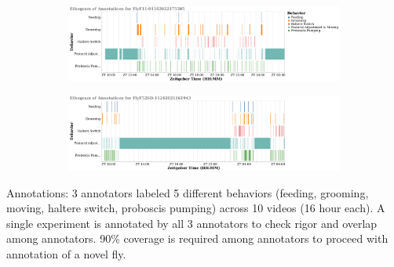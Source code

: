 \begin{figure}[ht!]
	\centering
	\begin{subfigure}[ht!]{0.95\linewidth}
		\centering\includegraphics[width=\linewidth]{figures/FlyF11-01182022175505_annotation_ethogram.pdf}
		\caption{}
	\end{subfigure}%

	\centering
	\begin{subfigure}[ht!]{0.95\linewidth}
		\centering\includegraphics[width=\linewidth]{figures/FlyF52SD-11242021161943_annotation_ethogram.pdf}
		\caption{}
	\end{subfigure}%
	\caption{}
\end{figure}

Annotations: 3 annotators labeled 5 different behaviors (feeding, grooming, moving, haltere switch, proboscis pumping) across 10 videos (16 hour each).
A single experiment is annotated by all 3 annotators to check rigor and overlap among annotators.
90\% coverage is required among annotators to proceed with annotation of a novel fly.
